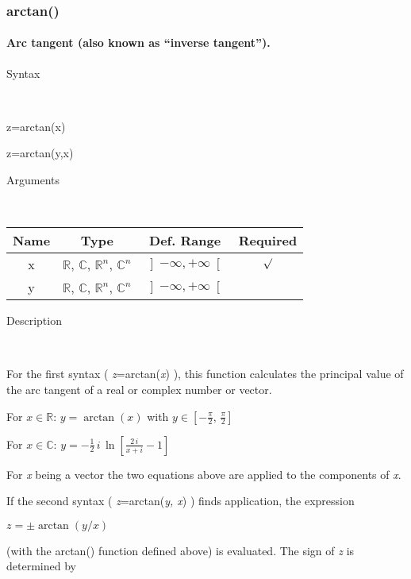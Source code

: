 \newpage
\subsubsection*{\hypertarget{arctan}{}{\Large arctan()}}


\paragraph{\label{par:Arc-tangent}Arc tangent (also known as {}``inverse tangent'').}

\begin{description}
\item [Syntax]~
\end{description}
z=arctan(x)

z=arctan(y,x)

\begin{description}
\item [Arguments]~
\end{description}
\begin{tabular}{|c|c|c|c|}
\hline 
Name&
Type&
Def. Range&
Required\tabularnewline
\hline
\hline 
x&
$\mathbb{R}$, $\mathbb{C}$, $\mathbb{R}^{n}$, $\mathbb{C}^{n}$&
$\left]-\infty,+\infty\right[$&
$\surd$\tabularnewline
\hline
y&
$\mathbb{R}$, $\mathbb{C}$, $\mathbb{R}^{n}$, $\mathbb{C}^{n}$&
$\left]-\infty,+\infty\right[$&
\tabularnewline
\hline
\end{tabular}

\begin{description}
\item [Description]~
\end{description}
For the first syntax ( \textit{z}=arctan(\textit{x}) ), this function
calculates the principal value of the arc tangent of a real or complex
number or vector.

\medskip{}
For $x\in\mathbb{R}$: $y=\arctan\left(x\right)$ with $y\in\left[-\frac{\pi}{2},\,\frac{\pi}{2}\right]$

\medskip{}
For $x\in\mathbb{C}$: $y={\displaystyle -\frac{1}{2}\, i\,\ln\left[\frac{2\, i}{x+i}-1\right]}$
\medskip{}

For \textit{x} being a vector the two equations above are
applied to the components of \textit{x}.

If the second syntax ( \textit{z}=arctan(\textit{y, x})
) finds application, the expression

\medskip{}
$z=\pm\arctan\left(y/x\right)$
\medskip{}

(with the arctan() function defined above) is evaluated.
The sign of \textit{z} is determined by

